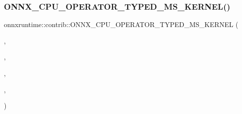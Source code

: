 \subsubsection{\texorpdfstring{O\+N\+N\+X\+\_\+\+C\+P\+U\+\_\+\+O\+P\+E\+R\+A\+T\+O\+R\+\_\+\+T\+Y\+P\+E\+D\+\_\+\+M\+S\+\_\+\+K\+E\+R\+N\+E\+L()}{ONNX\_CPU\_OPERATOR\_TYPED\_MS\_KERNEL()}\hspace{0.1cm}{\footnotesize\ttfamily [2/3]}}
{\footnotesize\ttfamily onnxruntime\+::contrib\+::\+O\+N\+N\+X\+\_\+\+C\+P\+U\+\_\+\+O\+P\+E\+R\+A\+T\+O\+R\+\_\+\+T\+Y\+P\+E\+D\+\_\+\+M\+S\+\_\+\+K\+E\+R\+N\+EL (\begin{DoxyParamCaption}\item[{\mbox{\hyperlink{classonnxruntime_1_1contrib_1_1ExpandDims}{Expand\+Dims}}}]{,  }\item[{1}]{,  }\item[{float}]{,  }\item[{\mbox{\hyperlink{classonnxruntime_1_1KernelDefBuilder}{Kernel\+Def\+Builder}}() .Alias(0, 0) .Type\+Constraint(\char`\"{}T\char`\"{}, Data\+Type\+Impl\+::\+All\+Tensor\+Types()) .Type\+Constraint(\char`\"{}axis\char`\"{}, Data\+Type\+Impl\+::\+Get\+Tensor\+Type$<$ int32\+\_\+t $>$())}]{,  }\item[{\mbox{\hyperlink{classonnxruntime_1_1contrib_1_1ExpandDims}{contrib\+::\+Expand\+Dims}}}]{ }\end{DoxyParamCaption})}

\mbox{\label{namespaceonnxruntime_1_1contrib_a8eeb043219c951c5e40d00df0db24171}} 
